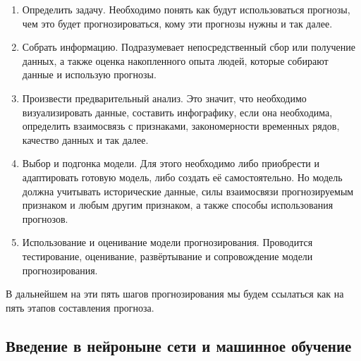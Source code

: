 {  \begin{enumerate} %
    \item Определить задачу. Необходимо понять как будут использоваться прогнозы, чем это будет прогнозироваться, кому эти прогнозы нужны и так далее. 
    \item Собрать информацию. Подразумевает непосредственный сбор или получение данных, а также оценка накопленного опыта людей, которые собирают данные и использую прогнозы.
    \item Произвести предварительный анализ. Это значит, что необходимо визуализировать данные, составить инфографику, если она необходима, определить взаимосвязь с признаками, закономерности временных рядов, качество данных и так далее.
    \item Выбор и подгонка модели. Для этого необходимо либо приобрести и адаптировать готовую модель, либо создать её самостоятельно. Но модель должна учитывать исторические данные, силы взаимосвязи прогнозируемым признаком и любым другим признаком, а также способы использования прогнозов.
    \item Использование и оценивание модели прогнозирования. Проводится тестирование, оценивание, развёртывание и сопровождение модели прогнозирования. 
  \end{enumerate} %

  \par \redline В дальнейшем на эти пять шагов прогнозирования мы будем ссылаться как на пять этапов составления прогноза.

  \par %
}

\titlespace
\subsection*{  \cyrillicfont 
  \fontsize{14pt}{24pt}\selectfont
  \englishfont
  \redline
  Введение в нейроныне сети и машинное обучение
}
\titlespace

